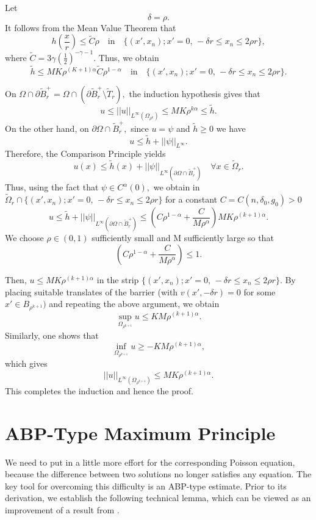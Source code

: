 \documentclass[11pt, leqno]{article}
\theoremstyle{definition}
\theoremstyle{remark}
\numberwithin{equation}{section}
\begin{document}
Let $$\delta=\rho.$$
It follows from the Mean Value Theorem that 
$$h\left(\frac{x}{r}\right)\leq \tilde{C}\rho \quad\text{in}\quad \{(x',x_n); x'=0,\,-\delta r\leq x_n\leq 2\rho r\},$$
where $\tilde{C}=3\gamma\left(\frac{1}{2}\right)^{-\gamma-1}.$
Thus, we obtain 
$$\tilde{h}\leq MK\rho^{(K+1)\alpha}\tilde{C}\rho^{1-\alpha} \quad\text{in}\quad \{(x',x_n); x'=0,\,-\delta r\leq x_n\leq 2\rho r\}.$$

On $\Omega\cap\partial\tilde{B}_r^+=\Omega\cap(\partial\tilde{B}_r^+\setminus \tilde{T}_r),$ the induction hypothesis gives that
 $$u\leq ||u||_{L^\infty(\Omega_{\rho^k})}\leq MK\rho^{k\alpha} \leq \tilde{h}. $$
On the other hand, on $\partial\Omega\cap\tilde{B}_r^+,$ since $u=\psi$ and $\tilde{h}\geq 0$ we have
$$u\leq \tilde{h}+ ||\psi||_{L^\infty}.$$
Therefore, the Comparison Principle \cite[Lemma 2.8]{MarWol08} yields
$$u(x)\leq \tilde{h}(x) + ||\psi||_{L^\infty(\partial\Omega\cap\tilde{B}_r^+)}\quad\forall x\in \tilde{\Omega}_r. $$
Thus, using the fact that $\psi\in C^\alpha(0),$ we obtain in $\tilde{\Omega}_r\cap\{(x',x_n); x'=0,\,-\delta r\leq x_n\leq 2\rho r\}$ for a constant $C=C(n, \delta_0, g_0)>0$ 
$$u\leq \tilde{h} + ||\psi||_{L^\infty(\partial\Omega\cap\tilde{B}_r^+)} \leq \left(C\rho^{1-\alpha}+ \frac{C}{M\rho^\alpha}\right)MK\rho^{(k+1)\alpha}. $$
We choose \(\rho\in(0,1)\) sufficiently small and M sufficiently large so that
 $$\left(C\rho^{1-\alpha}+\frac{C}{M\rho^\alpha} \right)\leq 1. $$

Then, $u\leq MK\rho^{(k+1)\alpha}$ in the strip $\{(x',x_n); x'=0,\,-\delta r\leq x_n\leq 2\rho r\}.$
By placing suitable translates of the barrier (with $v(x',-\delta r)=0$ for some $x'\in B_{\rho^{k+1}})$ and repeating the above argument, we obtain
$$\sup_{\Omega_{\rho^{k+1}}}u \leq KM\rho^{(k+1)\alpha}. $$
Similarly, one shows that 
 $$\inf_{\Omega_{\rho^{k+1}}}u \geq -KM\rho^{(k+1)\alpha}, $$
which gives  
$$||u||_{L^\infty(\Omega_{\rho^{k+1}})} \leq MK\rho^{(k+1)\alpha}.$$
This completes the induction and hence the proof.





\section{ABP-Type Maximum Principle}\label{Sec4}

We need to put in a little more effort for the corresponding Poisson equation, because the difference between two solutions no longer satisfies any equation. The key tool for overcoming this difficulty is an ABP-type estimate. Prior to its derivation, we establish the following technical lemma, which can be viewed as an improvement of a result from \cite{Lian}. 
\end{document}
